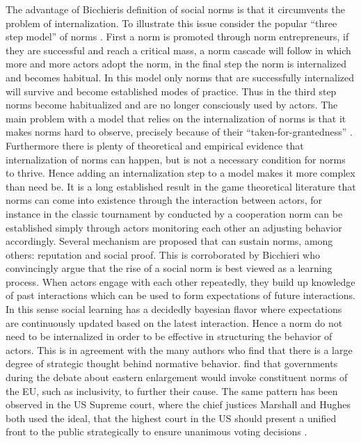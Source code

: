 The advantage of Bicchieris definition of social norms is that it circumvents the problem of internalization. To illustrate this issue consider the popular ``three step model'' of norms \citet{Finnemore1998}. First a norm is promoted through norm entrepreneurs, if they are successful and reach a critical mass, a norm cascade will follow in which more and more actors adopt the norm, in the final step the norm is internalized and becomes habitual. In this model only norms that are successfully internalized will survive and become established modes of practice. Thus in the third step norms become habitualized and are no longer consciously used by actors. The main problem with a model that relies on the internalization of norms is that it makes norms hard to observe, precisely because of their ``taken-for-grantedness'' \citep[495]{Johnston2001}. Furthermore there is plenty of theoretical and empirical evidence that internalization of norms can happen, but is not a necessary condition for norms to thrive. Hence adding an internalization step to a model makes it more complex than need be. It is a long established result in the game theoretical literature that norms can come into existence through the interaction between actors, for instance in the classic tournament by conducted by \cite{Axelrod1986} a cooperation norm can be established simply through actors monitoring each other an adjusting behavior accordingly. Several mechanism are proposed that can sustain norms, among others: reputation and social proof. This is corroborated by Bicchieri who convincingly argue that the rise of a social norm is best viewed as a learning process. When actors engage with each other repeatedly, they build up knowledge of past interactions which can be used to form expectations of future interactions. In this sense social learning has a decidedly bayesian flavor where expectations are continuously updated based on the latest interaction. Hence a norm do not need to be internalized in order to be effective in structuring the behavior of actors.  This is in agreement with the many authors who find that there is a large degree of strategic thought behind normative behavior. \citet{Schimmelfennig2003} find that governments during the debate about eastern enlargement would invoke constituent norms of the EU, such as inclusivity, to further their cause. The same pattern has been observed in the US Supreme court, where the chief justices Marshall and Hughes both used the ideal, that the highest court in the US should present a unified front to the public strategically to ensure unanimous voting decisions \citep{CalderiaZorn1998,Epstein2001}.  


